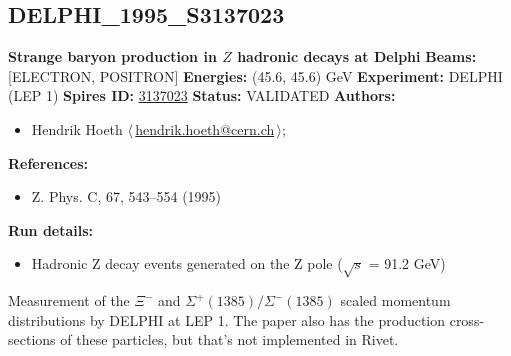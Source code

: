 \subsection[DELPHI\_1995\_S3137023]{DELPHI\_1995\_S3137023\,\cite{Abreu:1995qx}}
\textbf{Strange baryon production in $Z$ hadronic decays at Delphi}\newline
\textbf{Beams:} [ELECTRON, POSITRON] \newline
\textbf{Energies:} (45.6, 45.6) GeV \newline
\textbf{Experiment:} DELPHI (LEP 1) \newline
\textbf{Spires ID:} \href{http://www.slac.stanford.edu/spires/find/hep/www?rawcmd=key+3137023}{3137023}\newline
\textbf{Status:} VALIDATED\newline
\textbf{Authors:}
\begin{itemize}
  \item Hendrik Hoeth $\langle\,$\href{mailto:hendrik.hoeth@cern.ch}{hendrik.hoeth@cern.ch}$\,\rangle$;
\end{itemize}
\textbf{References:}
\begin{itemize}
  \item Z. Phys. C, 67, 543--554 (1995)
\end{itemize}
\textbf{Run details:}
\begin{itemize}

  \item Hadronic Z decay events generated on the Z pole (\ensuremath{\sqrt{s}} = 91.2 GeV)\end{itemize}

\noindent Measurement of the $\Xi^-$ and $\Sigma^+(1385)/\Sigma^-(1385)$ scaled momentum distributions by DELPHI at LEP 1. The paper also has the production cross-sections of these particles, but that's not implemented in Rivet.

\clearpage


\clearpage

